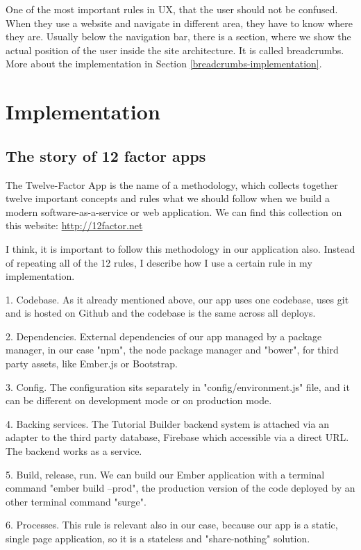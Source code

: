 \documentclass[11pt, a4paper, oneside, openright, medskipamount]{report}
\begin{document}
One of the most important rules in UX, that the user should not be confused. When they use a website and navigate in different area, they have to know where they are. Usually below the navigation bar, there is a section, where we show the actual position of the user inside the site architecture. It is called breadcrumbs. More about the implementation in Section \ref{breadcrumbs-implementation}.

\chapter{Implementation}

\section{The story of 12 factor apps}

The Twelve-Factor App is the name of a methodology, which collects together twelve important concepts and rules what we should follow when we build a modern software-as-a-service or web application. We can find this collection on this website: \url{http://12factor.net}

I think, it is important to follow this methodology in our application also. Instead of repeating all of the 12 rules, I describe how I use a certain rule in my implementation.

1. Codebase. As it already mentioned above, our app uses one codebase, uses git and is hosted on Github and the codebase is the same across all deploys.

2. Dependencies. External dependencies of our app managed by a package manager, in our case "npm", the node package manager and "bower", for third party assets, like Ember.js or Bootstrap.

3. Config. The configuration sits separately in "config/environment.js" file, and it can be different on development mode or on production mode.

4. Backing services. The Tutorial Builder backend system is attached via an adapter to the third party database, Firebase which accessible via a direct URL. The backend works as a service.

5. Build, release, run. We can build our Ember application with a terminal command "ember build --prod", the production version of the code deployed by an other terminal command "surge".

6. Processes. This rule is relevant also in our case, because our app is a static, single page application, so it is a stateless and "share-nothing" solution.
\end{document}
